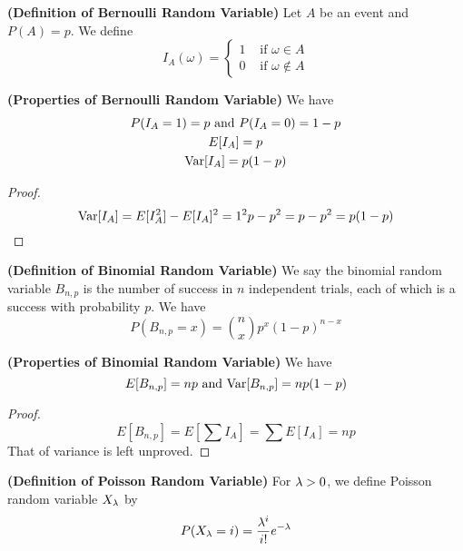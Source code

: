 \documentclass{report}
\begin{document}
\begin{definition}
\label{1.1.10}
\textbf{(Definition of Bernoulli Random Variable)} Let $A$ be an event and $P(A)=p$. We define
\begin{equation}
I_A(\omega)=\begin{cases}
  1& \text{ if  }\omega \in A\\
  0& \text{ if  }\omega\not\in A
\end{cases}
\end{equation}
\end{definition}
\begin{theorem}
\label{1.1.11}
\textbf{(Properties of Bernoulli Random Variable)} We have
\begin{gather}
P(I_A=1)=p \text{ and }P(I_A=0)=1-p\\ 
E[I_A]=p\\
\text{Var} [I_A]=p(1-p)
\end{gather}
\end{theorem}
\begin{proof}
\begin{equation}
\text{Var} [I_A]=E[I_A^2]-E[I_A]^2=1^2p-p^2=p-p^2=p(1-p)
\end{equation}
\end{proof}
\begin{definition}
\label{1.1.12}
\textbf{(Definition of Binomial Random Variable)} We say the binomial random variable $B_{n,p}$ is the number of success in $n$ independent trials, each of which is a success with probability $p$. We have
\begin{equation}
P(B_{n,p}=x)=\binom{n}{x}p^x (1-p)^{n-x}
\end{equation}
\end{definition}
\begin{theorem}
\label{1.1.13}
\textbf{(Properties of Binomial Random Variable)} We have
\begin{equation}
E[B_{n,p}]=np \text{ and }\text{Var} [B_{n,p}]= np(1-p)
\end{equation}
\end{theorem}
\begin{proof} 
\begin{equation}
E[B_{n,p}]=E[\sum I_A]=\sum E[I_A]=np
\end{equation}
That of variance is left unproved. 
\end{proof}
\begin{definition}
\label{1.1.14}
  \textbf{(Definition of Poisson Random Variable)} For $\lambda >0$, we define Poisson random variable $X_{\lambda }$ by
  \begin{equation}
  P(X_\lambda =i)=\frac{\lambda ^i}{i!}e^{-\lambda }
  \end{equation}
\end{definition}
\end{document}
